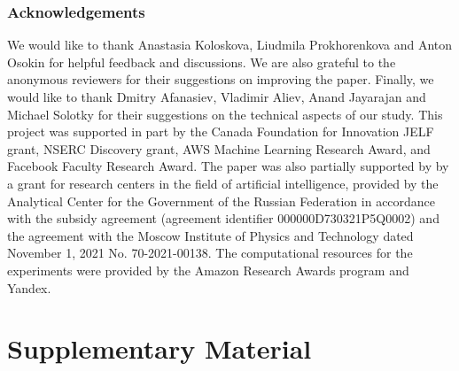 \documentclass[letterpaper]{article}
\begin{document}
\vspace{-6pt}
\section*{Acknowledgements}
\vspace{-4pt}
We would like to thank Anastasia Koloskova, Liudmila Prokhorenkova and Anton Osokin for helpful feedback and discussions. We are also grateful to the anonymous reviewers for their suggestions on improving the paper. Finally, we would like to thank Dmitry Afanasiev, Vladimir Aliev, Anand Jayarajan and Michael Solotky for their suggestions on the technical aspects of our study. 
This project was supported in
part by the Canada Foundation for Innovation JELF grant,
NSERC Discovery grant, AWS Machine Learning Research
Award, and Facebook Faculty Research Award. The paper was also partially supported by by a grant for research centers in the field of artificial intelligence, provided by the Analytical Center for the Government of the Russian Federation in accordance with the subsidy agreement (agreement identifier 000000D730321P5Q0002) and the agreement with the Moscow Institute of Physics and Technology dated November 1, 2021 No. 70-2021-00138. The computational resources for the experiments were provided by the Amazon Research Awards program and Yandex.













\clearpage
\part*{Supplementary Material}
\appendix















\end{document}
